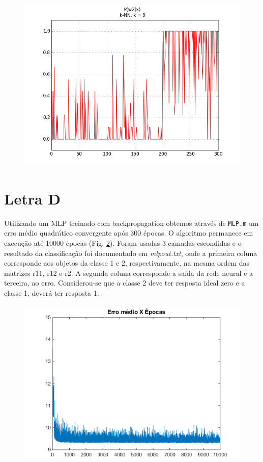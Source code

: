 \documentclass[12pt,twoside]{report}
\newcommand{\figureref}[1]{Fig. \ref{fig:#1}}
\newcommand{\code}[1]{\texttt{#1}}
\begin{document}
\begin{figure}[ht]
    \centering
    \includegraphics[scale=0.5]{kNN-k9-P_w2_given_x}
    \caption{}
    \label{fig:kNN-k9-P_w2_given_x}
\end{figure}


\section*{Letra D}

Utilizando um MLP treinado com backpropagation obtemos através de \code{MLP.m} um
erro médio quadrático convergente após 300 épocas. O algoritmo permanece em execução
até 10000 épocas (\figureref{mse_x_epochs}). Foram usadas 3 camadas escondidas e
o resultado da classificação foi documentado em \emph{mlpout.txt}, onde a primeira
coluna corresponde aos objetos da classe 1 e 2, respectivamente, na mesma ordem
das matrizes r11, r12 e r2. A segunda coluna corresponde a saída da rede neural
e a terceira, ao erro. Considerou-se que a classe 2 deve ter resposta ideal zero
e a classe 1, deverá ter resposta 1.

\begin{figure}[ht]
    \centering
    \includegraphics[scale=0.75]{mse_x_epochs}
    \caption{}
    \label{fig:mse_x_epochs}
\end{figure}
\end{document}
